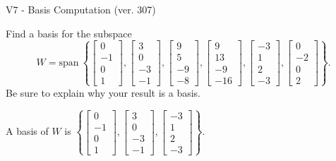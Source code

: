 \begin{exercise}
  \begin{exerciseTitle}V7 - Basis Computation (ver. 307)\end{exerciseTitle}
  \begin{exerciseStatement}
    Find a basis for the subspace 
\[W=\mathrm{span}\ \left\{\left[\begin{array}{r}
0 \\
-1 \\
0 \\
1
\end{array}\right] , \left[\begin{array}{r}
3 \\
0 \\
-3 \\
-1
\end{array}\right] , \left[\begin{array}{r}
9 \\
5 \\
-9 \\
-8
\end{array}\right] , \left[\begin{array}{r}
9 \\
13 \\
-9 \\
-16
\end{array}\right] , \left[\begin{array}{r}
-3 \\
1 \\
2 \\
-3
\end{array}\right] , \left[\begin{array}{r}
0 \\
-2 \\
0 \\
2
\end{array}\right]\right\}.\]
 Be sure to explain why your result is a basis.


  \end{exerciseStatement}
  \begin{exerciseAnswer}
   A basis of \(W\) is  \(\left\{\left[\begin{array}{r}
0 \\
-1 \\
0 \\
1
\end{array}\right] , \left[\begin{array}{r}
3 \\
0 \\
-3 \\
-1
\end{array}\right] , \left[\begin{array}{r}
-3 \\
1 \\
2 \\
-3
\end{array}\right]\right\}\).
  


  \end{exerciseAnswer}
\end{exercise}